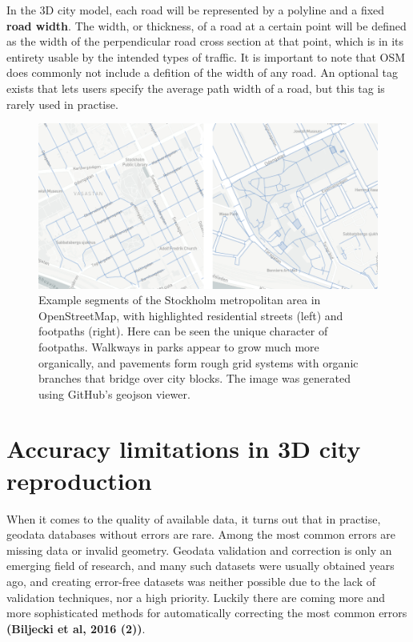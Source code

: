 \documentclass{kththesis}
\begin{document}
In the 3D city model, each road will be represented by a polyline and a fixed \textbf{road width}. The width, or thickness, of a road at a certain point will be defined as the width of the perpendicular road cross section at that point, which is in its entirety usable by the intended types of traffic.
It is important to note that OSM does commonly not include a defition of the width of any road. An optional tag exists that lets users specify the average path width of a road, but this tag is rarely used in practise.

\begin{figure}[H]
    \centering
    \includegraphics[width=\textwidth,height=0.5\textheight,keepaspectratio]{img_map_residential_footpath_compare}
    \caption{Example segments of the Stockholm metropolitan area in OpenStreetMap, with highlighted residential streets (left) and footpaths (right). Here can be seen the unique character of footpaths. Walkways in parks appear to grow much more organically, and pavements form rough grid systems with organic branches that bridge over city blocks. The image was generated using GitHub's geojson viewer.}
    \label{fig:residential-footpath-map}
\end{figure}

\section{Accuracy limitations in 3D city reproduction}

When it comes to the quality of available data, it turns out that in practise, geodata databases without errors are rare.
Among the most common errors are missing data or invalid geometry.
Geodata validation and correction is only an emerging field of research, and many such datasets were usually obtained years ago, and creating error-free datasets was neither possible due to the lack of validation techniques, nor a high priority.
Luckily there are coming more and more sophisticated methods for automatically correcting the most common errors
\textbf{(Biljecki et al, 2016 (2))}.
\end{document}
